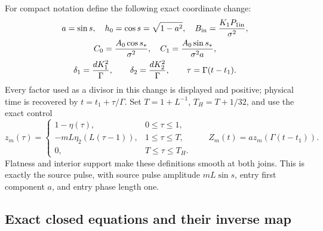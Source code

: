 For compact notation define the following exact coordinate change:
\begin{equation}\label{cvlane:sr:parameters}
 \begin{gathered}
 a=\sin s,\quad h_0=\cos s=\sqrt{1-a^2},\quad
 B_{\rm in}=\frac{K_1P_{1\rm in}}{\sigma^2},\\
 C_0=\frac{A_0\cos s_*}{\sigma^2},\quad
 C_1=\frac{A_0\sin s_*}{\sigma^2a},\\
 \delta_1=\frac{dK_1^2}{\Gamma},\qquad
 \delta_2=\frac{dK_2^2}{\Gamma},\qquad
 \tau=\Gamma(t-t_1).
 \end{gathered}
\end{equation}
Every factor used as a divisor in this change is displayed and positive; physical
time is recovered by $t=t_1+\tau/\Gamma$.
Set $T=1+L^{-1}$, $T_H=T+1/32$, and use the exact control
\begin{equation}\label{cvlane:sr:z}
 z_m(\tau)=
 \begin{cases}
  1-\eta(\tau),&0\leq\tau\leq1,\\
  -mL\eta_2(L(\tau-1)),&1\leq\tau\leq T,\\
  0,&T\leq\tau\leq T_H.
 \end{cases}
 \qquad Z_m(t)=a z_m(\Gamma(t-t_1)).
\end{equation}
Flatness and interior support make these definitions smooth at both
joins. This is exactly the source pulse, with source pulse amplitude
$mL\sin s$, entry first component $a$, and entry phase length one.

\subsection{Exact closed equations and their inverse map}

